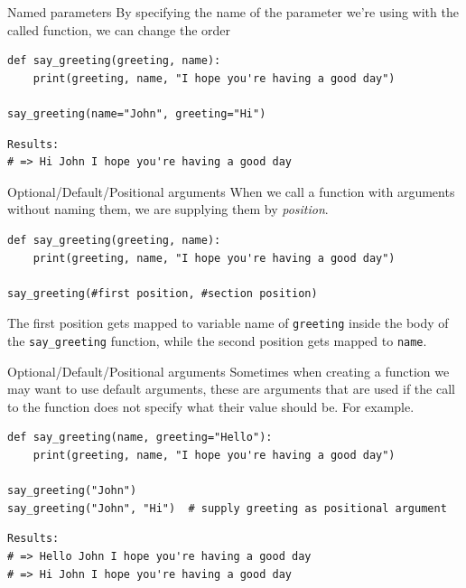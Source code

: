 \documentclass[10pt]{beamer}
\begin{document}
\begin{frame}[label={sec:org9a5a924},fragile]{Named parameters}
 By specifying the name of the parameter we're using with the called function, we can
change the order

\begin{verbatim}
def say_greeting(greeting, name):
    print(greeting, name, "I hope you're having a good day")

say_greeting(name="John", greeting="Hi")
\end{verbatim}

\begin{verbatim}
Results: 
# => Hi John I hope you're having a good day
\end{verbatim}
\end{frame}

\begin{frame}[label={sec:org93b6155},fragile]{Optional/Default/Positional arguments}
 When we call a function with arguments without naming them, we are supplying them by
\emph{position}.

\begin{verbatim}
def say_greeting(greeting, name):
    print(greeting, name, "I hope you're having a good day")

say_greeting(#first position, #section position)
\end{verbatim}

The first position gets mapped to variable name of \texttt{greeting} inside the body of the
\texttt{say\_greeting} function, while the second position gets mapped to \texttt{name}. 
\end{frame}

\begin{frame}[label={sec:org627de27},fragile]{Optional/Default/Positional arguments}
 Sometimes when creating a function we may want to use default arguments, these are
arguments that are used if the call to the function does not specify what their value
should be. For example.

\begin{verbatim}
def say_greeting(name, greeting="Hello"):
    print(greeting, name, "I hope you're having a good day")

say_greeting("John")
say_greeting("John", "Hi")  # supply greeting as positional argument
\end{verbatim}

\begin{verbatim}
Results: 
# => Hello John I hope you're having a good day
# => Hi John I hope you're having a good day
\end{verbatim}
\end{frame}
\end{document}
